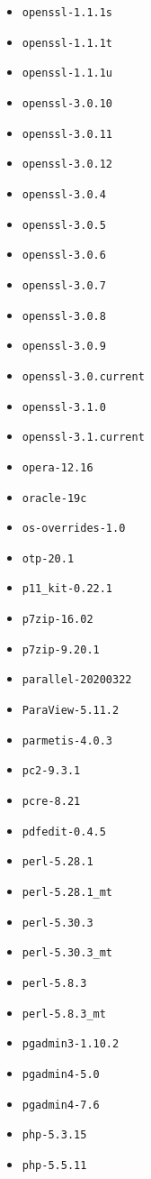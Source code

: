 \begin{multicols}{3}
\begin{itemize}
\item \verb|openssl-1.1.1s|
\item \verb|openssl-1.1.1t|
\item \verb|openssl-1.1.1u|
\item \verb|openssl-3.0.10|
\item \verb|openssl-3.0.11|
\item \verb|openssl-3.0.12|
\item \verb|openssl-3.0.4|
\item \verb|openssl-3.0.5|
\item \verb|openssl-3.0.6|
\item \verb|openssl-3.0.7|
\item \verb|openssl-3.0.8|
\item \verb|openssl-3.0.9|
\item \verb|openssl-3.0.current|
\item \verb|openssl-3.1.0|
\item \verb|openssl-3.1.current|
\item \verb|opera-12.16|
\item \verb|oracle-19c|
\item \verb|os-overrides-1.0|
\item \verb|otp-20.1|
\item \verb|p11_kit-0.22.1|
\item \verb|p7zip-16.02|
\item \verb|p7zip-9.20.1|
\item \verb|parallel-20200322|
\item \verb|ParaView-5.11.2|
\item \verb|parmetis-4.0.3|
\item \verb|pc2-9.3.1|
\item \verb|pcre-8.21|
\item \verb|pdfedit-0.4.5|
\item \verb|perl-5.28.1|
\item \verb|perl-5.28.1_mt|
\item \verb|perl-5.30.3|
\item \verb|perl-5.30.3_mt|
\item \verb|perl-5.8.3|
\item \verb|perl-5.8.3_mt|
\item \verb|pgadmin3-1.10.2|
\item \verb|pgadmin4-5.0|
\item \verb|pgadmin4-7.6|
\item \verb|php-5.3.15|
\item \verb|php-5.5.11|

\end{itemize}
\end{multicols}

